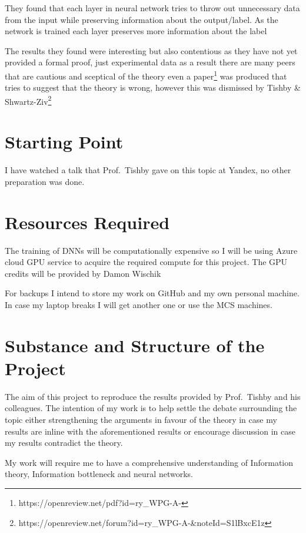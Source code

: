 \documentclass[12pt]{article}
\begin{document}
They found that each layer in neural network tries to throw out unnecessary data
from the input while preserving information about the output/label. As the
network is trained each layer preserves more information about the label

The results they found were interesting but also contentious as they have not
yet provided a formal proof, just experimental data as a result there are many
peers that are cautious and sceptical of the theory even a
paper\footnote{https://openreview.net/pdf?id=ry\_WPG-A-} was produced that tries
to suggest that the theory is wrong, however this was dismissed by Tishby \&
Shwartz-Ziv\footnote{https://openreview.net/forum?id=ry\_WPG-A-\&noteId=S1lBxcE1z}


\section*{Starting Point}

I have watched a talk that Prof.\ Tishby gave on this topic at Yandex, no other
preparation was done. 

\section*{Resources Required}

The training of DNNs will be computationally expensive so I will be using Azure
cloud GPU service to acquire the required compute for this project. The GPU
credits will be provided by Damon Wischik

For backups I intend to store my work on GitHub and my own personal machine. In
case my laptop breaks I will get another one or use the MCS machines.

\section*{Substance and Structure of the Project}

The aim of this project to reproduce the results provided by Prof.\ Tishby and
his colleagues. The intention of my work is to help settle the debate surrounding the
topic either strengthening the arguments in favour of the theory in case my
results are inline with the aforementioned results or encourage discussion in
case my results contradict the theory.

My work will require me to have a comprehensive understanding of Information
theory, Information bottleneck and neural networks.
\end{document}
